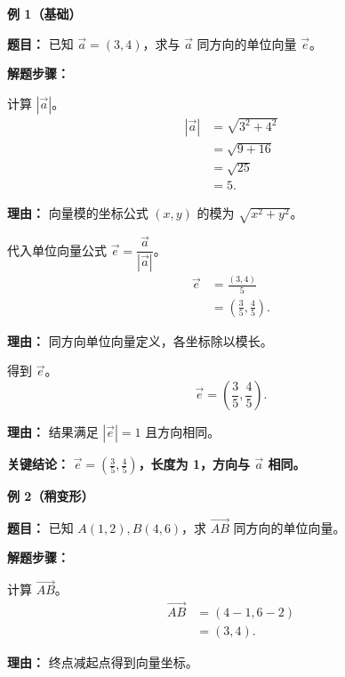 \begin{examplebox}
	\textbf{\textcolor{CExample}{例 1（基础）}}

	\textbf{\textcolor{CExample}{题目：}}
	已知 $\vec{a} = (3,4)$，求与 $\vec{a}$ 同方向的单位向量 $\vec{e}$。

	\textbf{\textcolor{CExample}{解题步骤：}}
	\begin{description}[style=nextline, leftmargin=2.8em, labelsep=0.5em, itemsep=0.45em]
		\item[\textbf{第一步（求向量模）：}] 计算 $|\vec{a}|$。
			\[
				\begin{aligned}
					|\vec{a}| &= \sqrt{3^2+4^2} \\
					&= \sqrt{9+16} \\
					&= \sqrt{25} \\
					&= 5.
			\end{aligned}
			\]
			\par\textbf{理由：}
			向量模的坐标公式 $(x,y)$ 的模为 $\sqrt{x^2+y^2}$。

		\item[\textbf{第二步（代入公式）：}] 代入单位向量公式 $\vec{e} = \dfrac{\vec{a}}{|\vec{a}|}$。
			\[
				\begin{aligned}
					\vec{e} &= \frac{(3,4)}{5} \\
					&= \left( \frac{3}{5}, \frac{4}{5} \right).
			\end{aligned}
			\]
			\par\textbf{理由：}
			同方向单位向量定义，各坐标除以模长。

		\item[\textbf{第三步（写出结论）：}] 得到 $\vec{e}$。
			\[
				\vec{e} = \left( \frac{3}{5}, \frac{4}{5} \right).
			\]
			\par\textbf{理由：}
			结果满足 $|\vec{e}|=1$ 且方向相同。
	\end{description}

	\textbf{\textcolor{CExample}{关键结论：}}
	\textbf{$\vec{e} = \left( \frac{3}{5}, \frac{4}{5} \right)$，长度为 1，方向与 $\vec{a}$ 相同。}

	\medskip
	\textbf{\textcolor{CExample}{例 2（稍变形）}}

	\textbf{\textcolor{CExample}{题目：}}
	已知 $A(1,2), B(4,6)$，求 $\overrightarrow{AB}$ 同方向的单位向量。

	\textbf{\textcolor{CExample}{解题步骤：}}
	\begin{description}[style=nextline, leftmargin=2.8em, labelsep=0.5em, itemsep=0.45em]
		\item[\textbf{第一步（求向量）：}] 计算 $\overrightarrow{AB}$。
			\[
				\begin{aligned}
					\overrightarrow{AB} &= (4-1,6-2) \\
					&= (3,4).
			\end{aligned}
			\]
			\par\textbf{理由：}
			终点减起点得到向量坐标。


\end{description}
\end{examplebox}
